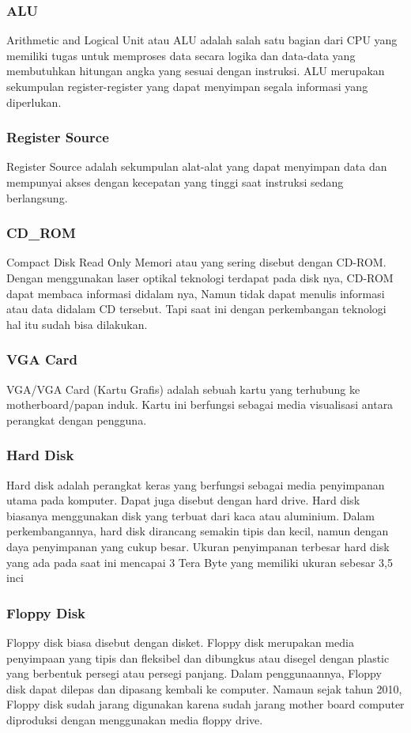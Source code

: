  			\subsubsection{ALU}
 		Arithmetic and Logical Unit atau ALU adalah salah satu bagian dari CPU yang memiliki tugas untuk memproses data secara logika dan data-data yang membutuhkan hitungan angka yang sesuai dengan instruksi. ALU merupakan sekumpulan register-register yang dapat menyimpan segala informasi yang diperlukan.
 			\subsubsection{Register Source}
 		Register Source adalah sekumpulan alat-alat yang dapat menyimpan data dan mempunyai akses dengan kecepatan yang tinggi saat instruksi sedang berlangsung.


 			\subsubsection{CD_ROM}
 		Compact Disk Read Only Memori atau yang sering disebut dengan CD-ROM. Dengan menggunakan laser optikal teknologi terdapat pada disk nya, CD-ROM dapat membaca informasi didalam nya, Namun
 		tidak dapat menulis informasi atau data didalam CD tersebut. Tapi saat ini dengan perkembangan teknologi hal itu sudah bisa dilakukan.
 			\subsubsection{VGA Card}
 		VGA/VGA Card (Kartu Grafis) adalah sebuah kartu yang terhubung ke motherboard/papan induk. Kartu ini berfungsi sebagai media visualisasi antara perangkat dengan pengguna.


 			\subsubsection{Hard Disk}
 		Hard disk adalah perangkat keras yang berfungsi sebagai media penyimpanan utama pada komputer. Dapat juga disebut dengan hard drive. Hard disk biasanya menggunakan disk yang  terbuat dari kaca atau aluminium. Dalam perkembangannya, hard disk dirancang semakin tipis dan kecil, namun dengan daya penyimpanan yang cukup besar. Ukuran penyimpanan terbesar hard disk yang ada pada saat ini mencapai 3 Tera Byte yang memiliki ukuran sebesar 3,5 inci
 			\subsubsection{Floppy Disk}
 		Floppy disk biasa disebut dengan disket. Floppy disk merupakan media penyimpaan yang tipis dan fleksibel dan dibungkus atau disegel dengan plastic yang berbentuk persegi atau persegi panjang. Dalam penggunaannya, Floppy disk dapat dilepas dan dipasang kembali ke computer. Namaun sejak tahun 2010, Floppy disk sudah jarang digunakan karena sudah jarang mother board computer diproduksi dengan menggunakan media floppy drive.



